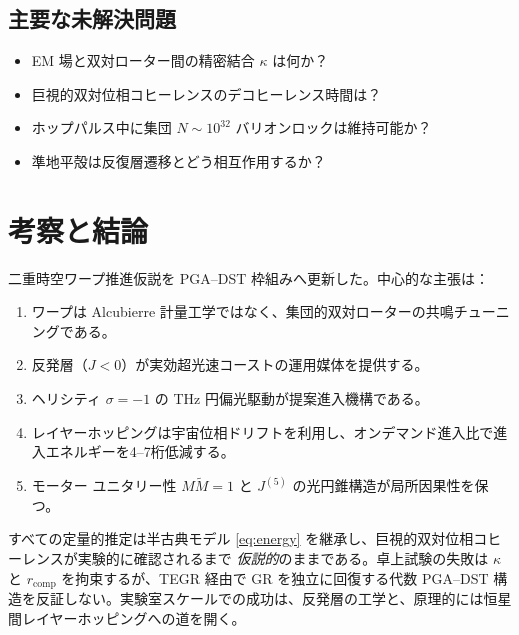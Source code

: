 \documentclass[dvipdfmx,a4paper]{article}
\theoremstyle{definition}
\begin{document}
\subsection{主要な未解決問題}

\begin{itemize}[leftmargin=2em]
  \item EM 場と双対ローター間の精密結合 $\kappa$ は何か？
  \item 巨視的双対位相コヒーレンスのデコヒーレンス時間は？
  \item ホップパルス中に集団 $N\sim 10^{32}$ バリオンロックは維持可能か？
  \item 準地平殻は反復層遷移とどう相互作用するか？
\end{itemize}

\section{考察と結論}
\label{sec:conclusions}

二重時空ワープ推進仮説を PGA--DST 枠組みへ更新した。中心的な主張は：

\begin{enumerate}[leftmargin=2em]
  \item ワープは Alcubierre 計量工学ではなく、集団的双対ローターの共鳴チューニングである。
  \item 反発層（$J<0$）が実効超光速コーストの運用媒体を提供する。
  \item ヘリシティ $\sigma=-1$ の THz 円偏光駆動が提案進入機構である。
  \item レイヤーホッピングは宇宙位相ドリフトを利用し、オンデマンド進入比で進入エネルギーを4--7桁低減する。
  \item モーター ユニタリー性 $M\widetilde{M}=1$ と $J^{(5)}$ の光円錐構造が局所因果性を保つ。
\end{enumerate}

すべての定量的推定は半古典モデル \eqref{eq:energy} を継承し、巨視的双対位相コヒーレンスが実験的に確認されるまで \emph{仮説的}のままである。卓上試験の失敗は $\kappa$ と $r_{\mathrm{comp}}$ を拘束するが、TEGR 経由で GR を独立に回復する代数 PGA--DST 構造を反証しない。実験室スケールでの成功は、反発層の工学と、原理的には恒星間レイヤーホッピングへの道を開く。
\end{document}
